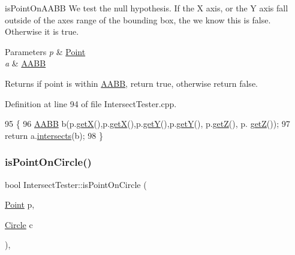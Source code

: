 is\+Point\+On\+A\+A\+BB We test the null hypothesis. If the X axis, or the Y axis fall outside of the axes range of the bounding box, the we know this is false. Otherwise it is true. 


\begin{DoxyParams}{Parameters}
{\em p} & \hyperlink{class_point}{Point} \\
\hline
{\em a} & \hyperlink{class_a_a_b_b}{A\+A\+BB} \\
\hline
\end{DoxyParams}
\begin{DoxyReturn}{Returns}
if point is within \hyperlink{class_a_a_b_b}{A\+A\+BB}, return true, otherwise return false. 
\end{DoxyReturn}


Definition at line 94 of file Intersect\+Tester.\+cpp.


\begin{DoxyCode}
95 \{
96     \hyperlink{class_a_a_b_b}{AABB} b(p.\hyperlink{class_point_a29c44ec7c7279e02629645a06cdaf7d5}{getX}(),p.\hyperlink{class_point_a29c44ec7c7279e02629645a06cdaf7d5}{getX}(),p.\hyperlink{class_point_a2371ffadbe245d12a8f556d0a976521b}{getY}(),p.\hyperlink{class_point_a2371ffadbe245d12a8f556d0a976521b}{getY}(), p.\hyperlink{class_point_a9bb9987e32b7dd8dec81ead5d428446c}{getZ}(), p.
      \hyperlink{class_point_a9bb9987e32b7dd8dec81ead5d428446c}{getZ}());
97     \textcolor{keywordflow}{return} a.\hyperlink{class_a_a_b_b_a62290d3f27644484f2df17c42cd1bfd5}{intersects}(b);
98 \}
\end{DoxyCode}
\mbox{\label{class_intersect_tester_a1adb6abbf2f6454b48be18cf5eb69333}} 
\subsubsection{\texorpdfstring{is\+Point\+On\+Circle()}{isPointOnCircle()}}
{\footnotesize\ttfamily bool Intersect\+Tester\+::is\+Point\+On\+Circle (\begin{DoxyParamCaption}\item[{\hyperlink{class_point}{Point}}]{p,  }\item[{\hyperlink{class_circle}{Circle}}]{c }\end{DoxyParamCaption})\hspace{0.3cm}{\ttfamily [static]}, {\ttfamily [private]}}



